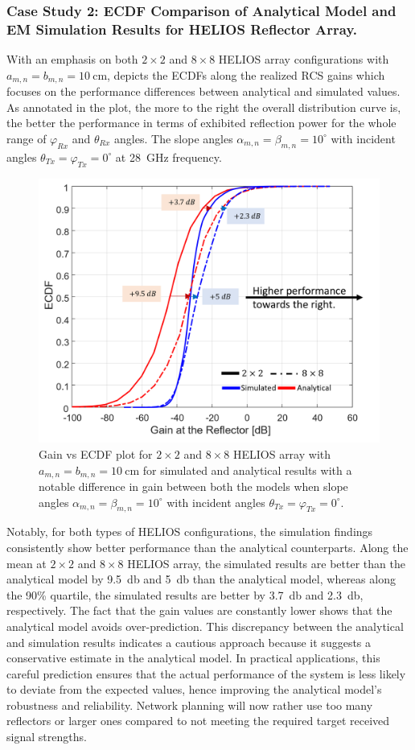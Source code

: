 \subsubsection{Case Study 2: ECDF Comparison of Analytical Model and EM Simulation Results for HELIOS Reflector Array.}
With an emphasis on both $\num{2}\times \num{2}$ and $\num{8}\times \num{8}$ HELIOS array configurations with $a_{m,n}=b_{m,n}=\SI{10}{\centi\meter}$,  depicts the ECDFs along the realized RCS gains which focuses on the performance differences between analytical and simulated values. As annotated in the plot, the more to the right the overall distribution curve is, the better the performance in terms of exhibited reflection power for the whole range of $\varphi_{Rx}$ and $\theta_{Rx}$ angles. The slope angles $\alpha_{m,n}=\beta_{m,n}=10^\circ$ with incident angles $\theta_{Tx}=\varphi_{Tx}=0^\circ$ at \SI{28}{\giga\hertz} frequency.

\begin{figure}[tb]
	\centering
	\includegraphics[width=0.7\linewidth]{images/Section 3 Images/ECDF_HELIOS_array}
	\caption{Gain vs ECDF plot for $\num{2}\times \num{2}$ and $\num{8}\times \num{8}$ HELIOS array with $a_{m,n}=b_{m,n}=\SI{10}{\centi\meter}$ for simulated and analytical results with a notable difference in gain between both the models when slope angles $\alpha_{m,n}=\beta_{m,n}=10^\circ$ with incident angles $\theta_{Tx}=\varphi_{Tx}=0^\circ$. }
	\label{fig:ECDF_HELIOS_array}
\end{figure}
Notably, for both types of HELIOS configurations, the simulation findings consistently show better performance than the analytical counterparts. Along the mean at $\num{2}\times \num{2}$ and $\num{8}\times \num{8}$ HELIOS array, the simulated results are better than the analytical model by \SI{9.5}{\decibel} and \SI{5}{\decibel} than the analytical model, whereas along the \num{90}\% quartile, the simulated results are better by \SI{3.7}{\decibel} and \SI{2.3}{\decibel}, respectively. The fact that the gain values are constantly lower shows that the analytical model avoids over-prediction. This discrepancy between the analytical and simulation results indicates a cautious approach because it suggests a conservative estimate in the analytical model. In practical applications, this careful prediction ensures that the actual performance of the system is less likely to deviate from the expected values, hence improving the analytical model's robustness and reliability. Network planning will now rather use too many reflectors or larger ones compared to not meeting the required target received signal strengths.
